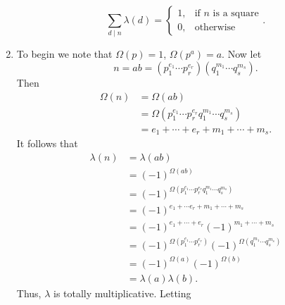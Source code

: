 \documentclass[12pt]{article}
\makeatletter
\theoremstyle{definition}
\theoremstyle{remark}
\renewenvironment{proof}[1][\proofname]{\par
  \pushQED{\qed}%
  \normalfont \topsep6\p@\@plus6\p@\relax
  \list{}{\leftmargin=0mm
          \rightmargin=4mm
          \settowidth{\itemindent}{\itshape#1}%
          \labelwidth=\itemindent
          \parsep=0pt \listparindent=\parindent 
  }
  \item[\hskip\labelsep
        \itshape
    #1\@addpunct{.}]\ignorespaces
}{%
  \popQED\endlist\@endpefalse
}
\let\oldproofname=\proofname
\renewcommand{\proofname}{\bf{\textit{\oldproofname}}}
\makeatother
\begin{document}
\begin{enumerate}[leftmargin=*]
\begin{equation*}
                \sum_{d\mid n}\lambda(d)=\begin{cases} 1, & \text{if $n$ is a square} \\ 0, & \text{otherwise} \end{cases}.
            \end{equation*}
            \begin{proof}
                To begin we note that $\Omega(p)=1$, $\Omega(p^a)=a$. Now let
                    \begin{equation*}
                        n=ab=(p_1^{e_1}\cdots p_r^{e_r})(q_1^{m_1}\cdots q_s^{m_s}).
                    \end{equation*}
                Then 
                    \begin{equation*}
                        \begin{split}
                            \Omega(n) &= \Omega(ab) \\
                            &= \Omega(p_1^{e_1}\cdots p_r^{e_r}q_1^{m_1}\cdots q_s^{m_s}) \\
                            &= e_1+\cdots+ e_r+ m_1+\cdots +m_s.
                        \end{split}
                    \end{equation*}
                It follows that
                    \begin{equation*}
                        \begin{split}
                            \lambda(n)&=\lambda(ab) \\
                            &=(-1)^{\Omega(ab)} \\
                            &=(-1)^{\Omega(p_1^{e_1}\cdots p_r^{e_r}q_1^{m_1}\cdots q_s^{m_s})} \\
                            &=(-1)^{e_1+\cdots e_r+m_1+\cdots+m_s} \\
                            &=(-1)^{e_1+\cdots+e_r}(-1)^{m_1+\cdots+m_s} \\
                            &=(-1)^{\Omega(p_1^{e_1}\cdots p_r^{e_r})}(-1)^{\Omega(q_1^{m_1}\cdots q_s^{m_s})} \\
                            &=(-1)^{\Omega(a)}(-1)^{\Omega(b)} \\
                            &=\lambda(a)\lambda(b).
                        \end{split}
                    \end{equation*}
                Thus, $\lambda$ is totally multiplicative. Letting
                    \begin{equation*}

\end{equation*}
\end{proof}
\end{enumerate}
\end{document}
